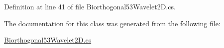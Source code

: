 Definition at line 41 of file Biorthogonal53\+Wavelet2\+D.\+cs.



The documentation for this class was generated from the following file\+:\begin{DoxyCompactItemize}
\item 
\hyperlink{_biorthogonal53_wavelet2_d_8cs}{Biorthogonal53\+Wavelet2\+D.\+cs}\end{DoxyCompactItemize}
